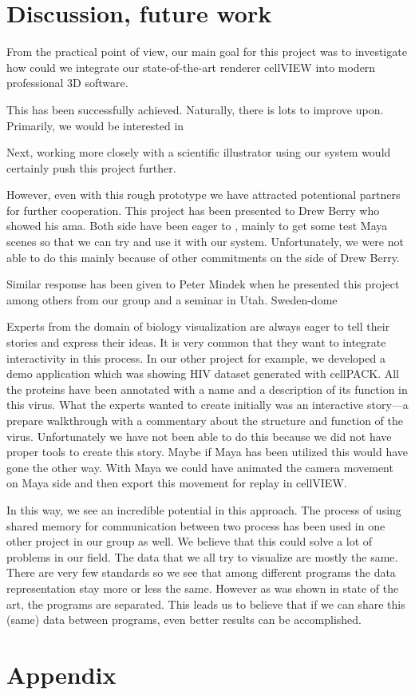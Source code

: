 \documentclass[
  digital, %
  table,   %
  nolof,     %
  nolot,     %
]{fithesis3}
\begin{document}

\chapter{Discussion, future work}
From the practical point of view, our main goal for this project was to investigate how could we integrate our state-of-the-art renderer cellVIEW into modern professional 3D software.

This has been successfully achieved. Naturally, there is lots to improve upon. Primarily, we would be interested in

Next, working more closely with a scientific illustrator using our system would certainly push this project further.

However, even with this rough prototype we have attracted potentional partners for further cooperation. This project has been presented to Drew Berry who showed his ama. Both side have been eager to , mainly to get some test Maya scenes so that we can try and use it with our system. Unfortunately, we were not able to do this mainly because of other commitments on the side of Drew Berry.

Similar response has been given to Peter Mindek when he presented this project among others from our group and a seminar in Utah. Sweden-dome

Experts from the domain of biology visualization are always eager to tell their stories and express their ideas. It is very common that they want to integrate interactivity in this process. In our other project for example, we developed a demo application which was showing HIV dataset generated with cellPACK. All the proteins have been annotated with a name and a description of its function in this virus. What the experts wanted to create initially was an interactive story—a prepare walkthrough with a commentary about the structure and function of the virus. Unfortunately we have not been able to do this because we did not have proper tools to create this story. Maybe if Maya has been utilized this would have gone the other way. With Maya we could have animated the camera movement on Maya side and then export this movement for replay in cellVIEW.

In this way, we see an incredible potential in this approach. The process of using shared memory for communication between two process has been used in one other project in our group as well. We believe that this could solve a lot of problems in our field. The data that we all try to visualize are mostly the same. There are very few standards so we see that among different programs the data representation stay more or less the same. However as was shown in state of the art, the programs are separated. This leads us to believe that if we can share this (same) data between programs, even better results can be accomplished.

\newpage
\printbibliography[heading=bibintoc]

\appendix %
\chapter{Appendix}
\end{document}

